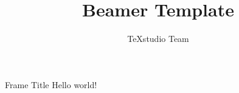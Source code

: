 \documentclass{beamer}
\title{Beamer Template}
\author{TeXstudio Team}
\begin{document}
\begin{frame}[plain]
    \maketitle 
\end{frame}
\begin{frame}{Frame Title}
	Hello world!
\end{frame}
\end{document}
